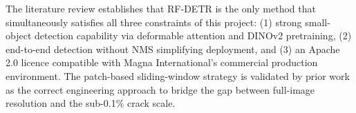 The literature review establishes that RF-DETR is the only method that simultaneously satisfies all three constraints of this project: (1) strong small-object detection capability via deformable attention and DINOv2 pretraining, (2) end-to-end detection without NMS simplifying deployment, and (3) an Apache 2.0 licence compatible with Magna International's commercial production environment. The patch-based sliding-window strategy is validated by prior work as the correct engineering approach to bridge the gap between full-image resolution and the sub-0.1\% crack scale.
